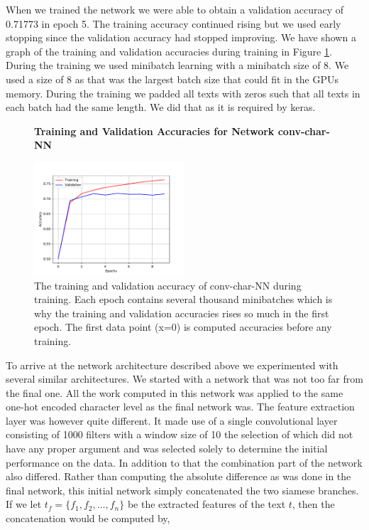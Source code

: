 When we trained the network we were able to obtain a validation accuracy of
0.71773 in epoch 5. The training accuracy continued rising but we used early
stopping since the validation accuracy had stopped improving. We have shown
a graph of the training and validation accuracies during training in Figure
\ref{fig:conv-char-NN-accuracies}. During the training we used minibatch
learning with a minibatch size of 8. We used a size of 8 as that was the largest
batch size that could fit in the GPUs memory. During the training we padded
all texts with zeros such that all texts in each batch had the same length. We
did that as it is required by keras.

\begin{figure}
    \centering
    \textbf{Training and Validation Accuracies for Network \gls{conv-char-NN}}\par\medskip
    \includegraphics[width=0.5\textwidth]{./pictures/experiments/conv_char_nn/training_accuracy}
    \caption{The training and validation accuracy of \gls{conv-char-NN} during
        training. Each epoch contains several thousand minibatches which is why
        the training and validation accuracies rises so much in the first
        epoch. The first data point (x=0) is computed accuracies before any
        training.}
    \label{fig:conv-char-NN-accuracies}
\end{figure}

To arrive at the network architecture described above we experimented with
several similar architectures. We started with a network that was not too
far from the final one. All the work computed in this network was applied
to the same one-hot encoded character level as the final network was. The
feature extraction layer was however quite different. It made use of a single
convolutional layer consisting of 1000 filters with a window size of 10 the
selection of which did not have any proper argument and was selected solely
to determine the initial performance on the data. In addition to that the
combination part of the network also differed. Rather than computing the
absolute difference as was done in the final network, this initial network
simply concatenated the two siamese branches. If we let $t_f = \{f_1, f_2,
\dots, f_n\}$ be the extracted features of the text $t$, then the concatenation
would be computed by,

